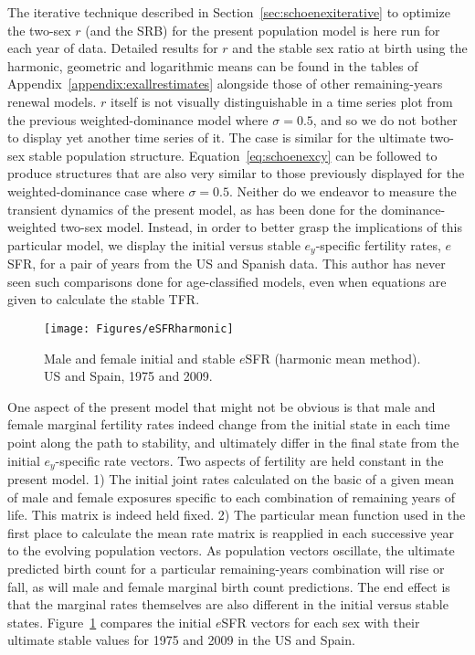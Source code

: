 \FloatBarrier
The iterative technique described in Section~\ref{sec:schoenexiterative} to
optimize the two-sex $r$ (and the SRB) for the present population model is here
run for each year of data. Detailed results for $r$ and
the stable sex ratio at birth using the harmonic, geometric and logarithmic
means can be found in the tables of Appendix~\ref{appendix:exallrestimates}
alongside those of other remaining-years renewal models. $r$ itself is not 
visually distinguishable in a time series plot from the previous
weighted-dominance model where $\sigma = 0.5$, and so we do not bother to display 
yet another time series of it. The case is
similar for the ultimate two-sex stable population structure.
Equation~\eqref{eq:schoenexcy} can be followed to produce structures that are also very similar to those
previously displayed for the weighted-dominance case where $\sigma = 0.5$.
Neither do we endeavor to measure the transient dynamics of the present model, 
as has been done for the dominance-weighted two-sex model. Instead, in order 
to better grasp the implications of this particular model, we display the
initial versus stable $e_y$-specific fertility rates, $e$SFR, for a pair of years from 
the US and Spanish data. This author has never seen such comparisons done for 
age-classified models, even when equations are given to calculate the stable
TFR.

\begin{figure}[ht!]
        \centering  
          \caption{Male and female initial and stable $e$SFR (harmonic mean
          method). US and Spain, 1975 and 2009.}
           \texttt{[image: Figures/eSFRharmonic]}
          \label{fig:eSFRharmonic}
\end{figure}

One aspect of the present model that might not be obvious is that male and
female marginal fertility rates indeed change from the initial state in each time point along
the path to stability, and ultimately differ in the final state from the initial
$e_y$-specific rate vectors. Two aspects of fertility are held constant in the
present model. 1) The initial joint rates calculated on the basic of a given
mean of male and female exposures specific to each combination of remaining
years of life. This matrix is indeed held fixed. 2) The particular mean function
used in the first place to calculate the mean rate matrix is reapplied in each
successive year to the evolving population vectors. As population vectors
oscillate, the ultimate predicted birth count for a particular remaining-years
combination will rise or fall, as will male and female marginal birth count
predictions. The end effect is that the marginal rates themselves are also
different in the initial versus stable states. Figure~\ref{fig:eSFRharmonic}
compares the initial $e$SFR vectors for each sex with their ultimate stable
values for 1975 and 2009 in the US and Spain.


